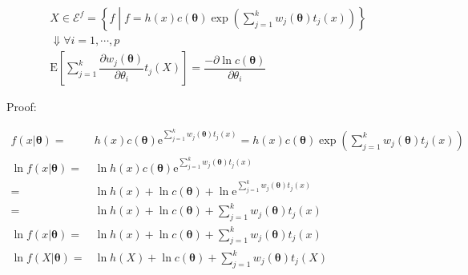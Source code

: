 \documentclass[
]{book}
\theoremstyle{definition}
\theoremstyle{definition}
\theoremstyle{definition}
\theoremstyle{definition}
\theoremstyle{remark}
\begin{document}
\[
\begin{array}{c}
X\in\mathcal{E}^{f}=\left\{ f\middle|f=h\left(x\right)c\left(\boldsymbol{\theta}\right)\exp\left(\sum\limits _{j=1}^{k}w_{{\scriptscriptstyle j}}\left(\boldsymbol{\theta}\right)t_{{\scriptscriptstyle j}}\left(x\right)\right)\right\} \\
\Downarrow\forall i=1,\cdots,p\\
\mathrm{E}\left[\sum\limits _{j=1}^{k}\dfrac{\partial w_{{\scriptscriptstyle j}}\left(\boldsymbol{\theta}\right)}{\partial\theta_{{\scriptscriptstyle i}}}t_{{\scriptscriptstyle j}}\left(X\right)\right]=\dfrac{-\partial\ln c\left(\boldsymbol{\theta}\right)}{\partial\theta_{{\scriptscriptstyle i}}}
\end{array}
\]

Proof:

\[
\begin{aligned}
f\left(x|\boldsymbol{\theta}\right)= & h\left(x\right)c\left(\boldsymbol{\theta}\right)\mathrm{e}^{{\scriptscriptstyle \sum\limits _{j=1}^{k}w_{{\scriptscriptstyle j}}\left(\boldsymbol{\theta}\right)t_{{\scriptscriptstyle j}}\left(x\right)}}=h\left(x\right)c\left(\boldsymbol{\theta}\right)\exp\left(\sum\limits _{j=1}^{k}w_{{\scriptscriptstyle j}}\left(\boldsymbol{\theta}\right)t_{{\scriptscriptstyle j}}\left(x\right)\right)\\
\ln f\left(x|\boldsymbol{\theta}\right)= & \ln h\left(x\right)c\left(\boldsymbol{\theta}\right)\mathrm{e}^{{\scriptscriptstyle \sum\limits _{j=1}^{k}w_{{\scriptscriptstyle j}}\left(\boldsymbol{\theta}\right)t_{{\scriptscriptstyle j}}\left(x\right)}}\\
= & \ln h\left(x\right)+\ln c\left(\boldsymbol{\theta}\right)+\ln\mathrm{e}^{{\scriptscriptstyle \sum\limits _{j=1}^{k}w_{{\scriptscriptstyle j}}\left(\boldsymbol{\theta}\right)t_{{\scriptscriptstyle j}}\left(x\right)}}\\
= & \ln h\left(x\right)+\ln c\left(\boldsymbol{\theta}\right)+\sum\limits _{j=1}^{k}w_{{\scriptscriptstyle j}}\left(\boldsymbol{\theta}\right)t_{{\scriptscriptstyle j}}\left(x\right)\\
\ln f\left(x|\boldsymbol{\theta}\right)= & \ln h\left(x\right)+\ln c\left(\boldsymbol{\theta}\right)+\sum\limits _{j=1}^{k}w_{{\scriptscriptstyle j}}\left(\boldsymbol{\theta}\right)t_{{\scriptscriptstyle j}}\left(x\right)\\
\ln f\left(X|\boldsymbol{\theta}\right)= & \ln h\left(X\right)+\ln c\left(\boldsymbol{\theta}\right)+\sum\limits _{j=1}^{k}w_{{\scriptscriptstyle j}}\left(\boldsymbol{\theta}\right)t_{{\scriptscriptstyle j}}\left(X\right)\\

\end{aligned}\]
\end{document}
